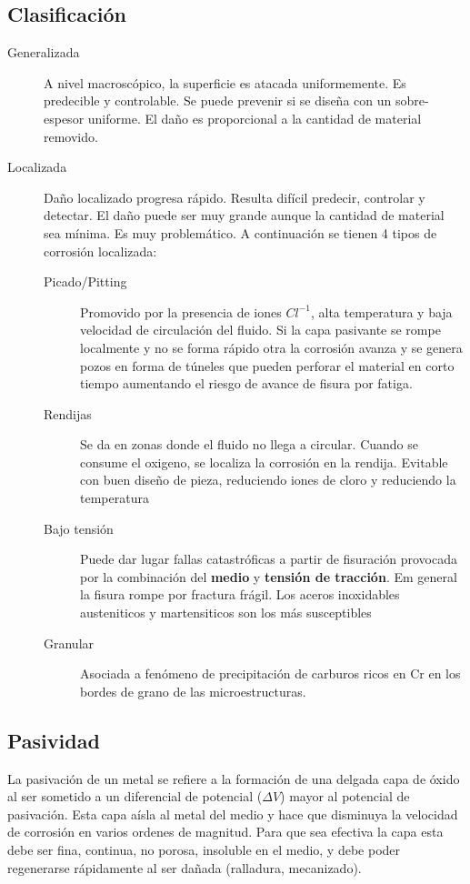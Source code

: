 \subsection{Clasificación}
\begin{description}
	\item[Generalizada] A nivel macroscópico, la superficie es atacada uniformemente. Es predecible y controlable. Se puede prevenir si se diseña con un sobre-espesor uniforme. El daño es proporcional a la cantidad de material removido.
	\item[Localizada] Daño localizado progresa rápido. Resulta difícil predecir, controlar y detectar. El daño puede ser muy grande aunque la cantidad de material sea mínima. Es muy problemático. A continuación se tienen 4 tipos de corrosión localizada:
	\begin{description}
		\item[Picado/Pitting] Promovido por la presencia de iones $Cl^{-1}$, alta temperatura y baja velocidad de circulación del fluido. Si la capa pasivante se rompe localmente y no se forma rápido otra la corrosión avanza y se genera pozos en forma de túneles que pueden perforar el material en corto tiempo aumentando el riesgo de avance de fisura por fatiga.
		\item[Rendijas] Se da en zonas donde el fluido no llega a circular. Cuando se consume el oxigeno, se localiza la corrosión en la rendija. Evitable con buen diseño de pieza, reduciendo iones de cloro y reduciendo la temperatura
		\item[Bajo tensión] Puede dar lugar  fallas catastróficas a partir de fisuración provocada por la combinación del \textbf{medio} y \textbf{tensión de tracción}. Em general la fisura rompe por fractura frágil. Los aceros inoxidables austeniticos y martensiticos son los más susceptibles
		\item[Granular] Asociada a fenómeno de precipitación de carburos ricos en Cr en los bordes de grano de las microestructuras.
	\end{description}
\end{description}


\subsection{Pasividad}
La pasivación de un metal se refiere a la formación de una delgada capa de óxido al ser sometido a un diferencial de potencial ($\Delta V$) mayor al potencial de pasivación. Esta capa aísla al metal del medio y hace que disminuya la velocidad de corrosión en varios ordenes de magnitud. Para que sea efectiva la capa esta debe ser fina, continua, no porosa, insoluble en el medio, y debe poder regenerarse rápidamente al ser dañada (ralladura, mecanizado). 

